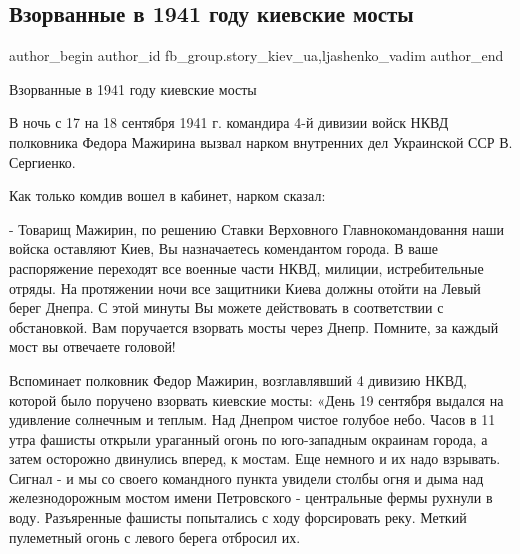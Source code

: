  
 
 
 
 
 
\subsection{Взорванные в 1941 году киевские мосты}
\label{sec:26_01_2022.fb.fb_group.story_kiev_ua.1.kiev_mosty_1941}
 
\ifcmt
 author_begin
   author_id fb_group.story_kiev_ua,ljashenko_vadim
 author_end
\fi

Взорванные в 1941 году киевские мосты 

В ночь с 17 на 18 сентября 1941 г.  командира 4-й дивизии войск НКВД полковника
Федора Мажирина вызвал нарком внутренних дел Украинской ССР В. Сергиенко. 

Как только комдив вошел в кабинет, нарком сказал:

- Товарищ Мажирин, по решению Ставки Верховного Главнокомандовання наши войска
оставляют Киев, Вы назначаетесь комендантом города. В ваше распоряжение
переходят все военные части НКВД, милиции, истребительные отряды. На протяжении
ночи все защитники Киева  должны отойти на Левый берег Днепра. С этой минуты Вы
можете действовать в соответствии с обстановкой. Вам поручается взорвать мосты
через Днепр. Помните, за каждый мост вы отвечаете головой!

Вспоминает полковник Федор Мажирин, возглавлявший 4 дивизию НКВД, которой было
поручено взорвать киевские мосты: «День 19 сентября выдался на удивление
солнечным и теплым. Над Днепром чистое голубое небо. Часов в 11 утра фашисты
открыли ураганный огонь по юго-западным окраинам города, а затем осторожно
двинулись вперед, к мостам. Еще немного и их надо взрывать. Сигнал - и мы со
своего командного пункта увидели столбы  огня и дыма над железнодорожным мостом
имени Петровского - центральные фермы рухнули в воду. Разъяренные фашисты
попытались с ходу форсировать реку. Меткий пулеметный огонь с левого берега
отбросил их.

